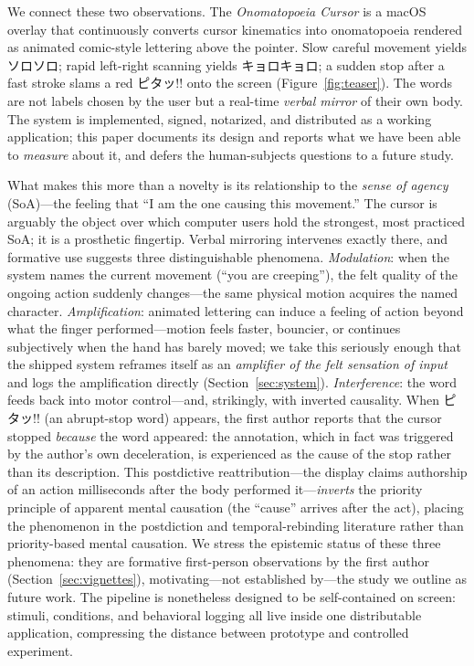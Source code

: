\documentclass[sigconf,nonacm]{acmart}
\newcommand{\jp}[1]{#1}
\begin{document}
We connect these two observations. The \emph{Onomatopoeia Cursor} is a macOS overlay that continuously converts cursor kinematics into onomatopoeia rendered as animated comic-style lettering above the pointer. Slow careful movement yields \jp{ソロソロ}; rapid left-right scanning yields \jp{キョロキョロ}; a sudden stop after a fast stroke slams a red \jp{ピタッ!!} onto the screen (Figure~\ref{fig:teaser}). The words are not labels chosen by the user but a real-time \emph{verbal mirror} of their own body. The system is implemented, signed, notarized, and distributed as a working application; this paper documents its design and reports what we have been able to \emph{measure} about it, and defers the human-subjects questions to a future study.

What makes this more than a novelty is its relationship to the \emph{sense of agency} (SoA)---the feeling that ``I am the one causing this movement.'' The cursor is arguably the object over which computer users hold the strongest, most practiced SoA; it is a prosthetic fingertip. Verbal mirroring intervenes exactly there, and formative use suggests three distinguishable phenomena. \emph{Modulation}: when the system names the current movement (``you are creeping''), the felt quality of the ongoing action suddenly changes---the same physical motion acquires the named character. \emph{Amplification}: animated lettering can induce a feeling of action beyond what the finger performed---motion feels faster, bouncier, or continues subjectively when the hand has barely moved; we take this seriously enough that the shipped system reframes itself as an \emph{amplifier of the felt sensation of input} and logs the amplification directly (Section~\ref{sec:system}). \emph{Interference}: the word feeds back into motor control---and, strikingly, with inverted causality. When \jp{ピタッ!!} (an abrupt-stop word) appears, the first author reports that the cursor stopped \emph{because} the word appeared: the annotation, which in fact was triggered by the author's own deceleration, is experienced as the cause of the stop rather than its description. This postdictive reattribution---the display claims authorship of an action milliseconds after the body performed it---\emph{inverts} the priority principle of apparent mental causation (the ``cause'' arrives after the act), placing the phenomenon in the postdiction and temporal-rebinding literature rather than priority-based mental causation. We stress the epistemic status of these three phenomena: they are formative first-person observations by the first author (Section~\ref{sec:vignettes}), motivating---not established by---the study we outline as future work. The pipeline is nonetheless designed to be self-contained on screen: stimuli, conditions, and behavioral logging all live inside one distributable application, compressing the distance between prototype and controlled experiment.
\end{document}
